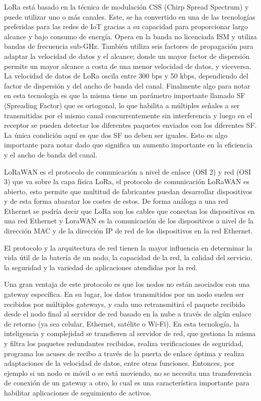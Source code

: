 LoRa está basado en la técnica de modulación CSS (Chirp Spread Spectrum) y puede utilizar uno o más canales. Este, se ha convertido en una de las tecnologías preferidas para las redes de IoT gracias a su capacidad para proporcionar largo alcance y bajo consumo de energía. Opera en la banda no licenciada ISM y utiliza bandas de frecuencia sub-GHz. También utiliza seis factores de propagación para adaptar la velocidad de datos y el alcance; donde un mayor factor de dispersión permite un mayor alcance a costa de una menor velocidad de datos, y viceversa. La velocidad de datos de LoRa oscila entre 300 bps y 50 kbps, dependiendo del factor  de dispersión y del ancho de banda del canal. Finalmente algo para notar en esta tecnología es que la misma tiene un parámetro importante llamado SF (Spreading Factor) que es ortogonal, lo que habilita a múltiples señales a ser transmitidas por el mismo canal concurrentemente sin interferencia y luego en el receptor se pueden detectar los diferentes paquetes enviados con los diferentes SF. La única condición aquí es que dos SF no deben ser iguales. Esto es algo importante para notar dado que significa un aumento importante en la eficiencia y el ancho de banda del canal.

LoRaWAN es el protocolo de comunicación a nivel de enlace (OSI 2) y red (OSI 3) que va sobre la capa física LoRa, el protocolo de comunicación LoRaWAN es abierto, esto permite que multitud de fabricantes puedan desarrollar dispositivos y de esta forma abaratar los costes de estos. De forma análoga a una red Ethernet se podría decir que LoRa son los cables que conectan los dispositivos en una red Ethernet y LoraWAN es la comunicación de los dispositivos a nivel de la dirección MAC y de la dirección IP de red de los dispositivos en la red Ethernet.

El protocolo y la arquitectura de red tienen la mayor influencia en determinar la vida útil de la batería de un nodo, la capacidad de la red, la calidad del servicio, la seguridad y la variedad de aplicaciones atendidas por la red.

Una gran ventaja de este protocolo es que los nodos no están asociados con una gateway específica. En su lugar, los datos transmitidos por un nodo suelen ser recibidos por múltiples gateways, y cada uno retransmitirá el paquete recibido desde el nodo final al servidor de red basado en la nube a través de algún enlace de retorno (ya sea celular, Ethernet, satélite o Wi-Fi). En esta tecnología, la inteligencia y complejidad se transfieren al servidor de red, que gestiona la misma y filtra los paquetes redundantes recibidos, realiza verificaciones de seguridad, programa los acuses de recibo a través de la puerta de enlace óptima y realiza adaptaciones de la velocidad de datos, entre otras funciones. Entonces, por ejemplo si un nodo es móvil o se está moviendo, no se necesita una transferencia de conexión de un gateway a otro, lo cual es una característica importante para habilitar aplicaciones de seguimiento de activos. 

